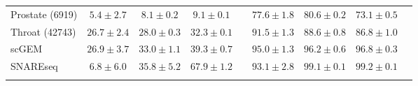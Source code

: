 \begin{table}
\begin{small}
\begin{tabular}{@{\hskip 0.1in}l@{\hskip 0.1in}c@{\hskip 0.1in}c@{\hskip 0.1in}c@{\hskip 0.1in}c@{\hskip 0.1in}c@{\hskip 0.1in}c@{\hskip 0.1in}c@{\hskip 0.1in}c@{\hskip 0.1in}}
Prostate \tiny{(6919)} & $5.4\pm2.7$ & $8.1\pm0.2$ & $\mathbf{9.1\pm0.1}$ && $77.6\pm1.8$ & $\mathbf{80.6\pm0.2}$ & $73.1\pm0.5$ \\ 
Throat \tiny{(42743)} & $26.7\pm2.4$ & $28.0\pm0.3$ & $\mathbf{32.3\pm0.1}$ && $\mathbf{91.5\pm1.3}$ & $88.6\pm0.8$ & $86.8\pm1.0$ \\ \midrule[0.2pt]
scGEM & $26.9\pm3.7$ & $33.0\pm1.1$ & $\mathbf{39.3\pm0.7}$ && $95.0\pm1.3$ & $96.2\pm0.6$ & $\mathbf{96.8\pm0.3}$ \\
SNAREseq & $6.8\pm6.0$ & $35.8\pm5.2$ & $\mathbf{67.9\pm1.2}$ && $93.1\pm2.8$ & $99.1\pm0.1$ & $\mathbf{99.2\pm0.1}$ \\
\bottomrule[1.5pt]
\label{tab:DR_genomics_data}
\end{tabular}
\end{small}
\vspace*{-0.5cm}
\end{table}


    